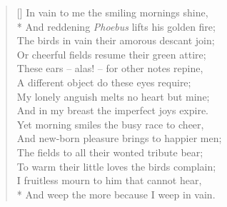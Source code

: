 \documentclass[MAIN]{subfiles}
\begin{document}
\settowidth{\versewidth}{In vain to me the smiling mornings shine,}
\begin{verse}[\versewidth]
In vain to me the smiling mornings shine,\\*
\vin And reddening \emph{Phoebus} lifts his golden fire;\\
The birds in vain their amorous descant join;\\
\vin Or cheerful fields resume their green attire;\\
These ears -- alas! -- for other notes repine,\\
\vin A different object do these eyes require;\\
My lonely anguish melts no heart but mine;\\
\vin And in my breast the imperfect joys expire.\\
Yet morning smiles the busy race to cheer,\\
\vin And new-born pleasure brings to happier men;\\
The fields to all their wonted tribute bear;\\
\vin To warm their little loves the birds complain;\\
I fruitless mourn to him that cannot hear,\\*
\vin And weep the more because I weep in vain. 
\end{verse}
\end{document}

